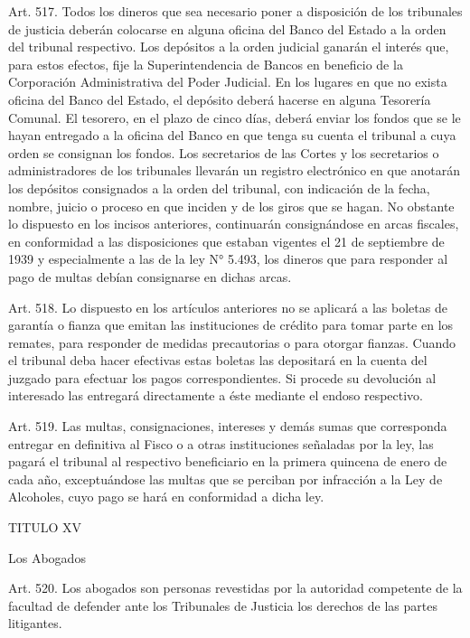     Art. 517. Todos los dineros que sea necesario poner a disposición de los tribunales de justicia deberán colocarse en alguna oficina del Banco del Estado a la orden del tribunal respectivo.
    Los depósitos a la orden judicial ganarán el interés que, para estos efectos, fije la Superintendencia de Bancos en beneficio de la Corporación Administrativa del Poder Judicial.
    En los lugares en que no exista oficina del Banco del Estado, el depósito deberá hacerse en alguna Tesorería Comunal. El tesorero, en el plazo de cinco días, deberá enviar los fondos que se le hayan entregado a la oficina del Banco en que tenga su cuenta el tribunal a cuya orden se consignan los fondos.
    Los secretarios de las Cortes y los secretarios o administradores de los tribunales llevarán un registro electrónico en que anotarán los depósitos consignados a la orden del tribunal, con indicación de la fecha, nombre, juicio o proceso en que inciden y de los giros que se hagan.
    No obstante lo dispuesto en los incisos anteriores, continuarán consignándose en arcas fiscales, en conformidad a las disposiciones que estaban vigentes el 21 de septiembre de 1939 y especialmente a las de la ley N° 5.493, los dineros que para responder al pago de multas debían consignarse en dichas arcas.



    Art. 518. Lo dispuesto en los artículos anteriores no se aplicará a las boletas de garantía o fianza que emitan las instituciones de crédito para tomar parte en los remates, para responder de medidas precautorias o para otorgar fianzas.
    Cuando el tribunal deba hacer efectivas estas boletas las depositará en la cuenta del juzgado para efectuar los pagos correspondientes. Si procede su devolución al interesado las entregará directamente a éste mediante el endoso respectivo.


    Art. 519. Las multas, consignaciones, intereses y demás sumas que corresponda entregar en definitiva al Fisco o a otras instituciones señaladas por la ley, las pagará el tribunal al respectivo beneficiario en la primera quincena de enero de cada año, exceptuándose las multas que se perciban por infracción a la Ley de Alcoholes, cuyo pago se hará en conformidad a dicha ley.


    TITULO XV

    Los Abogados


    Art. 520. Los abogados son personas revestidas por la autoridad competente de la facultad de defender ante los Tribunales de Justicia los derechos de las partes litigantes.

